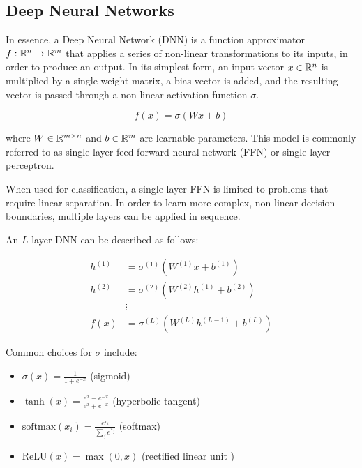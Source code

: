 \subsection{Deep Neural Networks}
In essence, a Deep Neural Network (DNN) is a function approximator $f: \mathbb{R}^n \rightarrow \mathbb{R}^m$ that applies a series of non-linear transformations to its inputs, in order to produce an output. In its simplest form, an input vector $x \in \mathbb{R}^n$ is multiplied by a single weight matrix, a bias vector is added, and the resulting vector is passed through a non-linear activation function $\sigma$.

\begin{equation}
    f(x) = \sigma(W x + b)
\end{equation}

where $W \in \mathbb{R}^{m \times n}$ and $b \in \mathbb{R}^{m}$ are learnable parameters.
This model is commonly referred to as single layer feed-forward neural network (FFN) or single layer perceptron.

When used for classification, a single layer FFN is limited to problems that require linear separation. In order to learn more complex, non-linear decision boundaries, multiple layers can be applied in sequence.

An $L$-layer DNN can be described as follows:

\begin{equation}
    \label{eq:DNN}
    \begin{split}
        h^{(1)} &= \sigma^{(1)}(W^{(1)} x + b^{(1)}) \\
        h^{(2)} &= \sigma^{(2)}(W^{(2)} h^{(1)} + b^{(2)}) \\
        & \vdots \\
        f(x) &= \sigma^{(L)}(W^{(L)} h^{(L-1)} + b^{(L)})
    \end{split}
\end{equation}

Common choices for $\sigma$ include:

\begin{itemize}
    \item $\sigma(x) = \frac{1}{1 + e^{-x}}$ (sigmoid)
    \item $\tanh(x) = \frac{e^x - e^{-x}}{e^x + e^{-x}}$ (hyperbolic tangent)
    \item $\text{softmax}(x_i) = \frac{e^{x_i}}{\sum_j e^{x_j}}$ (softmax)
    \item $\text{ReLU}(x) = \max(0, x)$ (rectified linear unit \cite{nair2010rectified})
\end{itemize}

